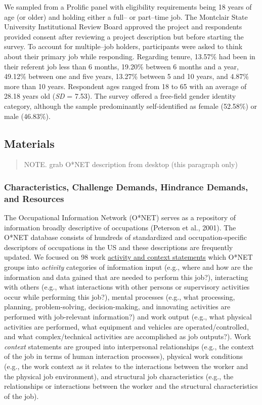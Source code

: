 \documentclass[
  man]{apa7}
\begin{document}
We sampled from a Prolific panel with eligibility requirements being 18 years of age (or older) and holding either a full-- or part--time job. The Montclair State University Institutional Review Board approved the project and respondents provided consent after reviewing a project description but before starting the survey. To account for multiple--job holders, participants were asked to think about their primary job while responding. Regarding tenure, 13.57\% had been in their referent job less than 6 months, 19.20\% between 6 months and a year, 49.12\% between one and five years, 13.27\% between 5 and 10 years, and 4.87\% more than 10 years. Respondent ages ranged from 18 to 65 with an average of 28.18 years old (\emph{SD} = 7.53). The survey offered a free-field gender identity category, although the sample predominantly self-identified as female (52.58\%) or male (46.83\%).

\hypertarget{materials}{%
\subsection{Materials}\label{materials}}

\begin{quote}
NOTE. grab O*NET description from desktop (this paragraph only)
\end{quote}

\hypertarget{characteristics-challenge-demands-hindrance-demands-and-resources}{%
\subsubsection{Characteristics, Challenge Demands, Hindrance Demands, and Resources}\label{characteristics-challenge-demands-hindrance-demands-and-resources}}

The Occupational Information Network (O*NET) serves as a repository of information broadly descriptive of occupations (Peterson et al., 2001). The O*NET database consists of hundreds of standardized and occupation-specific descriptors of occupations in the US and these descriptions are frequently updated. We focused on 98 work \href{https://www.ONETonline.org/find/descriptor/result/4.A.1.b.3}{activity and context statements} which O*NET groups into \emph{activity} categories of information input (e.g., where and how are the information and data gained that are needed to perform this job?), interacting with others (e.g., what interactions with other persons or supervisory activities occur while performing this job?), mental processes (e.g., what processing, planning, problem-solving, decision-making, and innovating activities are performed with job-relevant information?) and work output (e.g., what physical activities are performed, what equipment and vehicles are operated/controlled, and what complex/technical activities are accomplished as job outputs?). Work \emph{context} statements are grouped into interpersonal relationships (e.g., the context of the job in terms of human interaction processes), physical work conditions (e.g., the work context as it relates to the interactions between the worker and the physical job environment), and structural job characteristics (e.g., the relationships or interactions between the worker and the structural characteristics of the job).
\end{document}

